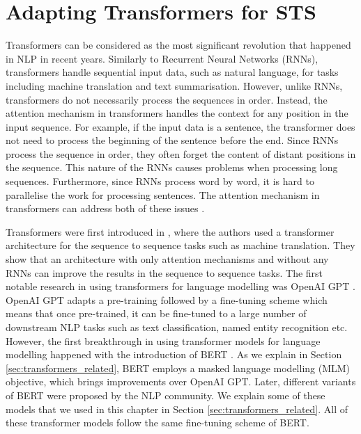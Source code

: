 \chapter{\label{cha:sts_transformers}Adapting Transformers for STS}

Transformers can be considered as the most significant revolution that happened in NLP in recent years. Similarly to Recurrent Neural Networks (RNNs), transformers handle sequential input data, such as natural language, for tasks including machine translation and text summarisation. However, unlike RNNs, transformers do not necessarily process the sequences in order. Instead, the attention mechanism in transformers handles the context for any position in the input sequence. For example, if the input data is a sentence, the transformer does not need to process the beginning of the sentence before the end. Since RNNs process the sequence in order, they often forget the content of distant positions in the sequence. This nature of the RNNs causes problems when processing long sequences. Furthermore, since RNNs process word by word, it is hard to parallelise the work for processing sentences. The attention mechanism in transformers can address both of these issues \autocite{NIPS2017_3f5ee243}.


Transformers were first introduced in \textcite{NIPS2017_3f5ee243}, where the authors used a transformer architecture for the sequence to sequence tasks such as machine translation. They show that an architecture with only attention mechanisms and without any RNNs can improve the results in the sequence to sequence tasks. The first notable research in using transformers for language modelling was OpenAI GPT \autocite{radford2018improving}. OpenAI GPT adapts a pre-training followed by a fine-tuning scheme which means that once pre-trained, it can be fine-tuned to a large number of downstream NLP tasks such as text classification, named entity recognition etc. However, the first breakthrough in using transformer models for language modelling happened with the introduction of BERT \autocite{devlin-etal-2019-bert}. As we explain in Section \ref{sec:transformers_related}, BERT employs a masked language modelling (MLM) objective, which brings improvements over OpenAI GPT. Later, different variants of BERT were proposed by the NLP community. We explain some of these models that we used in this chapter in Section \ref{sec:transformers_related}. All of these transformer models follow the same fine-tuning scheme of BERT.


